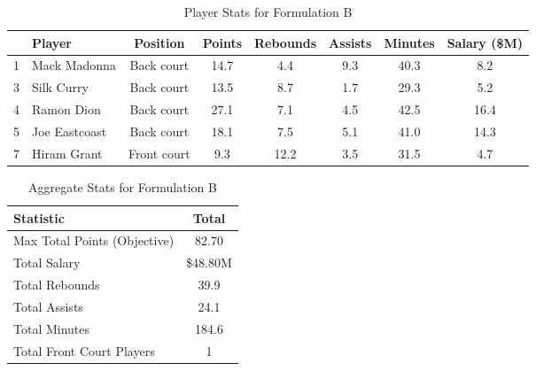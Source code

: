 \documentclass[a4paper,11pt]{article}
\begin{document}
\begin{table}[h!]
    \centering
    \renewcommand{\arraystretch}{1.2} %
    \begin{tabular}{rlcccccc}
        \hline
        & \textbf{Player} & \textbf{Position} & \textbf{Points} & \textbf{Rebounds} & \textbf{Assists} & \textbf{Minutes} & \textbf{Salary (\$M)} \\
        \hline
        1 & Mack Madonna    & Back court        & 14.7            & 4.4               & 9.3              & 40.3             & 8.2                   \\
        3 & Silk Curry      & Back court        & 13.5            & 8.7               & 1.7              & 29.3             & 5.2                   \\
        4 & Ramon Dion      & Back court        & 27.1            & 7.1               & 4.5              & 42.5             & 16.4                  \\
        5 & Joe Eastcoast   & Back court        & 18.1            & 7.5               & 5.1              & 41.0             & 14.3                  \\
        7 & Hiram Grant     & Front court       & 9.3             & 12.2              & 3.5              & 31.5             & 4.7                   \\
        \hline
    \end{tabular}
    \caption{Player Stats for Formulation B}
    \label{tab:selected_players_B}
\end{table}

\newpage

\begin{table}[h!]
    \centering
    \renewcommand{\arraystretch}{1.2} %
    \begin{tabular}{lc}
        \hline
        \textbf{Statistic}          & \textbf{Total} \\
        \hline
        Max Total Points (Objective) & 82.70          \\
        Total Salary                & \$48.80M         \\
        Total Rebounds              & 39.9           \\
        Total Assists               & 24.1           \\
        Total Minutes               & 184.6          \\
        Total Front Court Players   & 1              \\
        \hline
    \end{tabular}
    \caption{Aggregate Stats for Formulation B}
    \label{tab:team_totals_B}
\end{table}
\end{document}
